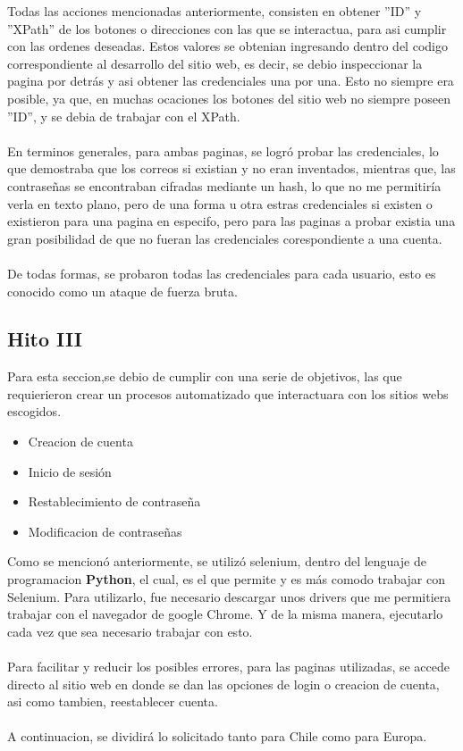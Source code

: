 \documentclass[]{article}
\begin{document}
Todas las acciones mencionadas anteriormente, consisten en obtener ''ID'' y ''XPath'' de los botones o direcciones con las que se
interactua, para asi cumplir con las ordenes deseadas. Estos valores se obtenian ingresando dentro del codigo correspondiente al desarrollo
del sitio web, es decir, se debio inspeccionar la pagina por detrás y asi obtener las credenciales una por una. Esto no siempre era posible, ya que, en muchas
ocaciones los botones del sitio web no siempre poseen ''ID'', y se debia de trabajar con el XPath.
\\\\
En terminos generales, para ambas paginas, se logró probar las credenciales, lo que demostraba que los correos si existian y no eran inventados, 
mientras que, las contraseñas se encontraban cifradas mediante un hash, lo que no me permitiría verla en texto plano, pero de una forma u otra
estras credenciales si existen o existieron para una pagina en especifo, pero para las paginas a probar existia una gran posibilidad de que
no fueran las credenciales corespondiente a una cuenta. 
\\\\
De todas formas, se probaron todas las credenciales para cada usuario, esto es conocido como un ataque de fuerza bruta.

\newpage
\subsection{Hito III}
Para esta seccion,se debio de cumplir con una serie de objetivos, las que requierieron crear un procesos automatizado que 
interactuara con los sitios webs escogidos. 
\begin{itemize}
    \item Creacion de cuenta
    \item Inicio de sesión
    \item Restablecimiento de contraseña
    \item Modificacion de contraseñas
\end{itemize}

Como se mencionó anteriormente, se utilizó selenium, dentro del lenguaje de programacion \textbf{Python}, el cual, es el que permite
y es más comodo trabajar con Selenium. Para utilizarlo, fue necesario descargar unos drivers que me permitiera trabajar con el navegador
de google Chrome. Y de la misma manera, ejecutarlo cada vez que sea necesario trabajar con esto.
\\\\
Para facilitar y reducir los posibles errores, para las paginas utilizadas, se accede directo al sitio web en donde se dan las opciones de 
login o creacion de cuenta, asi como tambien, reestablecer cuenta.
\\\\
A continuacion, se dividirá lo solicitado tanto para Chile como para Europa.
\end{document}
